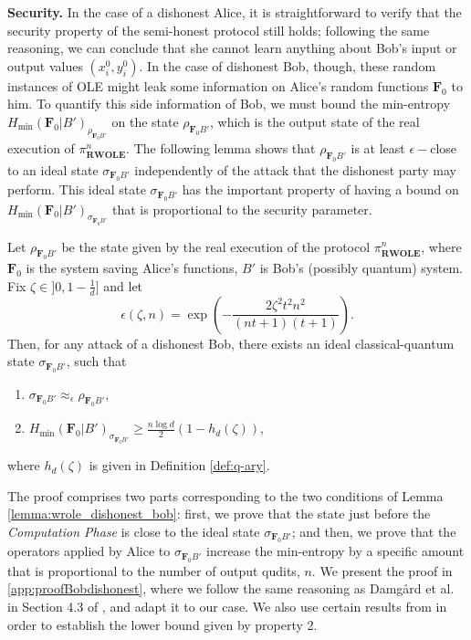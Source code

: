 \noindent\textbf{Security.} In the case of a dishonest Alice, it is straightforward to verify that the security property of the semi-honest protocol still holds; following the same reasoning, we can conclude that she cannot learn anything about Bob's input or output values $(x^0_i, y^0_i)$.  In the case of dishonest Bob, though, these random instances of OLE might leak some information on Alice's random functions $\mathbf{F}_0$ to him. To quantify this  side information of Bob, we must  bound the min-entropy $H_{\min}(\mathbf{F}_0|B')_{\rho_{\mathbf{F}_0 B'}}$ on the state $\rho_{\mathbf{F}_0 B'}$, which is the output state of the real execution of  $\pi^n_{\textbf{RWOLE}}$. The following lemma shows that  $\rho_{\mathbf{F}_0 B'}$  is at least $\epsilon-$close to an ideal state $\sigma_{\mathbf{F}_0 B'}$ independently of the attack that the dishonest party may perform. This ideal state $\sigma_{\mathbf{F}_0 B'}$ has the important property of having a bound on $H_{\min}(\mathbf{F}_0|B')_{\sigma_{\mathbf{F}_0 B'}}$ that is proportional to the security parameter. 
\begin{lemma}
\label{lemma:wrole_dishonest_bob}

Let $\rho_{\mathbf{F}_0 B'}$ be the state given by the real execution of the protocol $\mathcal{\pi}^n_{\textbf{RWOLE}}$, where $\mathbf{F}_0$ is the system saving Alice's functions, $B'$ is Bob's (possibly quantum) system. Fix $\zeta \in ]0, 1-\frac{1}{d}]$ and let 
$$\epsilon(\zeta, n) = \exp( -\frac{2 \zeta^2t^2n^2}{(nt+1)(t+1)}).$$
Then, for any attack of a dishonest Bob, there exists an ideal classical-quantum state $\sigma_{\mathbf{F}_0 B'}$, such that

\begin{enumerate}
    \item $ \sigma_{\mathbf{F}_0 B'} \approx_{\epsilon} \rho_{\mathbf{F}_0 B'}$,
    \item $ H_{\min}( \mathbf{F}_0 | B' )_{\sigma_{\mathbf{F}_0 B'}} \geq \frac{n\log d}{2}(1 - h_d(\zeta)) $,
\end{enumerate}
where $h_d(\zeta)$ is given in Definition \ref{def:q-ary}.

\end{lemma}
The proof comprises two parts corresponding to the two conditions of Lemma \ref{lemma:wrole_dishonest_bob}: first, we prove that the state just before the \textit{Computation Phase} is close to the ideal state $\sigma_{\mathbf{F}_0 B'}$; and then, we prove that the operators applied by Alice to $\sigma_{\mathbf{F}_0 B'}$ increase the min-entropy by a specific amount that is proportional to the number of output qudits, $n$. We present the proof in \ref{app:proofBobdishonest}, where we follow the same reasoning as Damg\r{a}rd et al. in Section 4.3 of \cite{DFLSS09}, and adapt it to our case.  We also use certain results from \cite{Dupuis2015} in order to establish the lower bound given by property 2.


